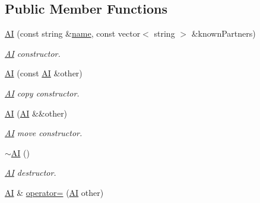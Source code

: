 \subsection*{\-Public \-Member \-Functions}
\begin{DoxyCompactItemize}
\item 
\hyperlink{classAI_a059fcf3ea09f908bca75567937f7e8a7}{\-A\-I} (const string \&\hyperlink{classPlayer_acf0355128a99ee20ad9931b760fb2de1}{name}, const vector$<$ string $>$ \&known\-Partners)
\begin{DoxyCompactList}\small\item\em \hyperlink{classAI}{\-A\-I} constructor. \end{DoxyCompactList}\item 
\hyperlink{classAI_aa58c0b5165f06063316d257abc996e41}{\-A\-I} (const \hyperlink{classAI}{\-A\-I} \&other)
\begin{DoxyCompactList}\small\item\em \hyperlink{classAI}{\-A\-I} copy constructor. \end{DoxyCompactList}\item 
\hyperlink{classAI_a8a2a39a4e227c23829cb77aa0f362af3}{\-A\-I} (\hyperlink{classAI}{\-A\-I} \&\&other)
\begin{DoxyCompactList}\small\item\em \hyperlink{classAI}{\-A\-I} move constructor. \end{DoxyCompactList}\item 
\hypertarget{classAI_a66a8645f0c27285cd75346f2c2bbfb14}{\hyperlink{classAI_a66a8645f0c27285cd75346f2c2bbfb14}{$\sim$\-A\-I} ()}\label{classAI_a66a8645f0c27285cd75346f2c2bbfb14}

\begin{DoxyCompactList}\small\item\em \hyperlink{classAI}{\-A\-I} destructor. \end{DoxyCompactList}\item 
\hypertarget{classAI_a1eb14f1ec8ef778f070362ba37f17d6c}{\hyperlink{classAI}{\-A\-I} \& \hyperlink{classAI_a1eb14f1ec8ef778f070362ba37f17d6c}{operator=} (\hyperlink{classAI}{\-A\-I} other)}\label{classAI_a1eb14f1ec8ef778f070362ba37f17d6c}


\end{DoxyCompactItemize}
